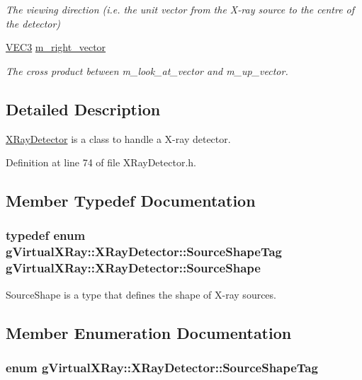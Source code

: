 \begin{DoxyCompactItemize}
\begin{DoxyCompactList}\small\item\em The viewing direction (i.e. the unit vector from the X-\/ray source to the centre of the detector) \end{DoxyCompactList}\item 
\hyperlink{class_math_1_1_vec3}{VEC3} \hyperlink{classg_virtual_x_ray_1_1_x_ray_detector_a43c90e61c73da70e02f73929873b443c}{m\_\-right\_\-vector}
\begin{DoxyCompactList}\small\item\em The cross product between m\_\-look\_\-at\_\-vector and m\_\-up\_\-vector. \end{DoxyCompactList}\end{DoxyCompactItemize}


\subsection{Detailed Description}
\hyperlink{classg_virtual_x_ray_1_1_x_ray_detector}{XRayDetector} is a class to handle a X-\/ray detector. 

Definition at line 74 of file XRayDetector.h.



\subsection{Member Typedef Documentation}
\hypertarget{classg_virtual_x_ray_1_1_x_ray_detector_a217628a4ed1ca8ed8031b288fb09d335}{
\subsubsection[{SourceShape}]{\setlength{\rightskip}{0pt plus 5cm}typedef enum {\bf gVirtualXRay::XRayDetector::SourceShapeTag}  {\bf gVirtualXRay::XRayDetector::SourceShape}}}
\label{classg_virtual_x_ray_1_1_x_ray_detector_a217628a4ed1ca8ed8031b288fb09d335}


SourceShape is a type that defines the shape of X-\/ray sources. 



\subsection{Member Enumeration Documentation}
\hypertarget{classg_virtual_x_ray_1_1_x_ray_detector_af449ad932589ae761d9da74e4c211c79}{
\subsubsection[{SourceShapeTag}]{\setlength{\rightskip}{0pt plus 5cm}enum {\bf gVirtualXRay::XRayDetector::SourceShapeTag}}}
\label{classg_virtual_x_ray_1_1_x_ray_detector_af449ad932589ae761d9da74e4c211c79}


